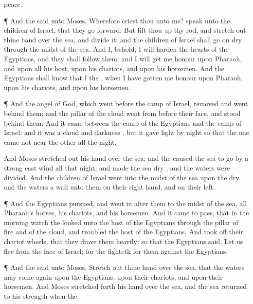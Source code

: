 {peace.
\par }{\PP {}¶ And the
{}
said unto
Moses, Wherefore
criest thou unto me?
speak unto the
children of
Israel, that they go
forward:
But lift thou
up thy
rod, and stretch
out thine
hand over the
sea, and
divide it: and the
children of
Israel shall
go on
dry
{} through the
midst of the
sea.
And I, behold, I will
harden the
hearts of the
Egyptians, and they shall
follow
them: and I will get me
honour upon
Pharaoh, and upon all his
host, upon his
chariots, and upon his
horsemen.
And the
Egyptians shall
know that I
{} the
{}, when I have gotten me
honour upon
Pharaoh, upon his
chariots, and upon his
horsemen.
\par }{\PP {}¶ And the
angel of
God, which
went
before the
camp of
Israel,
removed and
went
behind them; and the
pillar of the
cloud
went from before their
face, and
stood
behind them:
And it
came between the
camp of the
Egyptians and the
camp of
Israel; and it was a
cloud and
darkness
{}, but it gave
light by
night
{} so that the one came not
near the
other all the
night.
\par }{\PP {}And
Moses stretched
out his
hand over the
sea; and the
{} caused the
sea to
go
{} by a
strong
east
wind all that
night, and
made the
sea
dry
{}, and the
waters were
divided.
And the
children of
Israel
went into the
midst of the
sea upon the
dry
{} and the
waters
{} a
wall unto them on their right
hand, and on their
left.
\par }{\PP {}¶ And the
Egyptians
pursued, and went
in
after them to the
midst of the
sea,
{} all
Pharaoh’s
horses, his
chariots, and his
horsemen.
And it came to pass, that in the
morning
watch the
{}
looked unto the
host of the
Egyptians through the
pillar of
fire and of the
cloud, and
troubled the
host of the
Egyptians,
And took
off their
chariot
wheels, that they
drave them
heavily: so that the
Egyptians
said, Let us
flee from the
face of
Israel; for the
{}
fighteth for them against the
Egyptians.
\par }{\PP {}¶ And the
{}
said unto
Moses, Stretch
out thine
hand over the
sea, that the
waters may come
again upon the
Egyptians, upon their
chariots, and upon their
horsemen.
And
Moses stretched
forth his
hand over the
sea, and the
sea
returned to his
strength when the
}
